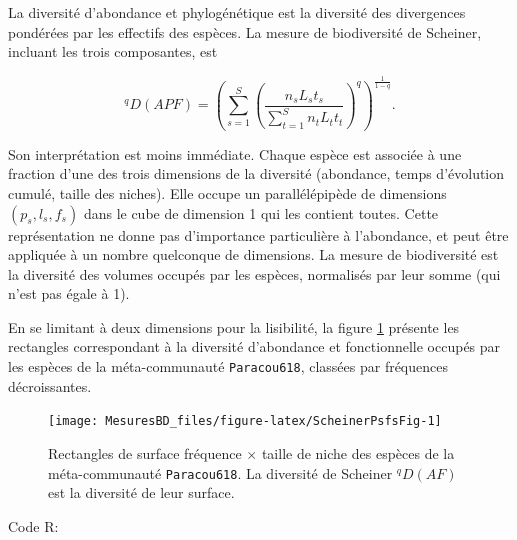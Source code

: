 \documentclass[
  11pt,
  french,
  a4paper,
  extrafontsizes,onecolumn,openright
  ]{memoir}
\newlength{\rf}
\begin{document}
La diversité d'abondance et phylogénétique est la diversité des divergences pondérées par les effectifs des espèces.
La mesure de biodiversité de Scheiner, incluant les trois composantes, est

\begin{equation}
  \label{eq:qDAF}
  ^{q}\!D(APF) = {\left(\sum^S_{s=1}{\left(\frac{n_s L_s t_s}{\sum^S_{t=1}{n_t L_t t_t}}\right)^q}\right)}^{\frac{1}{1-q}}.
\end{equation}

Son interprétation est moins immédiate.
Chaque espèce est associée à une fraction d'une des trois dimensions de la diversité (abondance, temps d'évolution cumulé, taille des niches).
Elle occupe un parallélépipède de dimensions \((p_s, l_s, f_s)\) dans le cube de dimension 1 qui les contient toutes.
Cette représentation ne donne pas d'importance particulière à l'abondance, et peut être appliquée à un nombre quelconque de dimensions.
La mesure de biodiversité est la diversité des volumes occupés par les espèces, normalisés par leur somme (qui n'est pas égale à 1).

En se limitant à deux dimensions pour la lisibilité, la figure \ref{fig:ScheinerPsfsFig} présente les rectangles correspondant à la diversité d'abondance et fonctionnelle occupés par les espèces de la méta-communauté \texttt{Paracou618}, classées par fréquences décroissantes.



\scriptsize

\begin{figure}

{\centering \texttt{[image: MesuresBD\_files/figure-latex/ScheinerPsfsFig-1]} 

}

\caption{Rectangles de surface fréquence \(\times\) taille de niche des espèces de la méta-communauté \texttt{Paracou618}. La diversité de Scheiner \(^{q}\!D(AF)\) est la diversité de leur surface.}\label{fig:ScheinerPsfsFig}
\end{figure}

\normalsize

Code R:

\scriptsize
\end{document}
